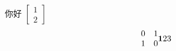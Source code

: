 \documentclass[a4paper,11pt]{article}
\begin{document}
	你好
$\left[ \begin{array}{c}
1\\
2
\end{array} \right]$\\
\begin{displaymath}
\begin{matrix}

0 & 1 \\

1 & 0

\end{matrix}
{\textbf 123}
\end{displaymath}
\end{document}
